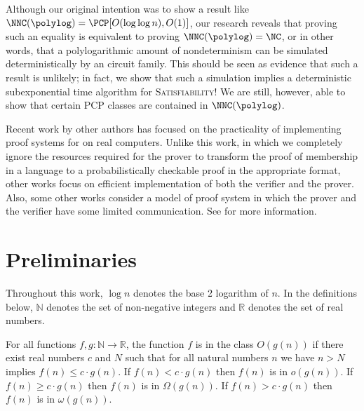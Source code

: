 \documentclass{article}
\newcommand{\loglog}{\log \log}
\begin{document}
Although our original intention was to show a result like $\NNC(\polylog) = \PCP[O(\loglog n), O(1)]$, our research reveals that proving such an equality is equivalent to proving $\NNC(\polylog) = \NC$, or in other words, that a polylogarithmic amount of nondeterminism can be simulated deterministically by an \NC{} circuit family.
This should be seen as evidence that such a result is unlikely; in fact, we show that such a simulation implies a deterministic subexponential time algorithm for \textsc{Satisfiability}!
We are still, however, able to show that certain PCP classes are contained in $\NNC(\polylog)$.

Recent work by other authors has focused on the practicality of implementing proof systems for \NP{} on real computers.
Unlike this work, in which we completely ignore the resources required for the prover to transform the proof of membership in a language to a probabilistically checkable proof in the appropriate format, other works focus on efficient implementation of both the verifier and the prover.
Also, some other works consider a model of proof system in which the prover and the verifier have some limited communication.
See \cite{bcgt12, smbw12, svpbbw12, trmp12, gkr08} for more information.

\section{Preliminaries}

Throughout this work, $\log n$ denotes the base 2 logarithm of $n$.
In the definitions below, $\mathbb{N}$ denotes the set of non-negative integers and $\mathbb{R}$ denotes the set of real numbers.

\begin{definition}
  For all functions $f, g \colon \mathbb{N} \to \mathbb{R}$, the function $f$ is in the class $O(g(n))$ if there exist real numbers $c$ and $N$ such that for all natural numbers $n$ we have $n > N$ implies $f(n) \leq c \cdot g(n)$.
  If $f(n) < c \cdot g(n)$ then $f(n)$ is in $o(g(n))$.
  If $f(n) \geq c \cdot g(n)$ then $f(n)$ is in $\Omega(g(n))$.
  If $f(n) > c \cdot g(n)$ then $f(n)$ is in $\omega(g(n))$.
\end{definition}
\end{document}
